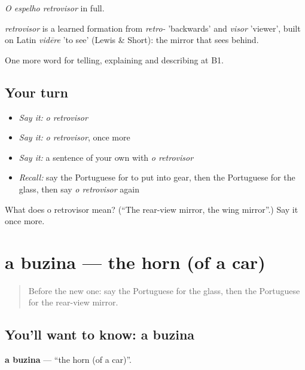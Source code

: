 \emph{O espelho retrovisor} in full.

\begin{cousinweb}
\emph{retrovisor} is a learned formation from \emph{retro-} 'backwards' and \emph{visor} 'viewer', built on Latin \emph{vidēre} 'to see' (Lewis \& Short): the mirror that sees behind.
\end{cousinweb}

\begin{grammarlens}[title={What you've built}]
One more word for telling, explaining and describing at B1.
\end{grammarlens}

\subsection*{Your turn}
\begin{itemize}
\raggedright
  \item \emph{Say it:} \emph{o retrovisor}
  \item \emph{Say it:} \emph{o retrovisor}, once more
  \item \emph{Say it:} a sentence of your own with \emph{o retrovisor}
  \item \emph{Recall:} say the Portuguese for to put into gear, then the Portuguese for the glass, then say \emph{o retrovisor} again
\end{itemize}

\begin{tcolorbox}[breakable,colback=teal!4,colframe=teal!35!black,title={Before you move on}]
What does o retrovisor mean? (\textquotedblleft{}The rear-view mirror, the wing mirror\textquotedblright{}.) Say it once more.
\end{tcolorbox}
\section[a buzina]{a buzina — the horn (of a car)}

\label{lesson:PT-C403-buzina}



\begin{quote}
Before the new one: say the Portuguese for the glass, then the Portuguese for the rear-view mirror.
\end{quote}

\subsection*{You'll want to know: a buzina}
\textbf{a buzina} — \textquotedblleft{}the horn (of a car)\textquotedblright{}.

